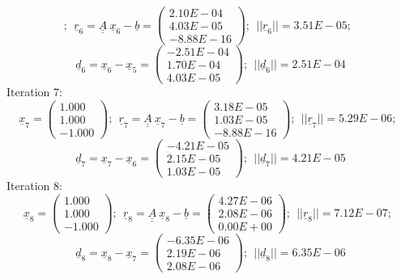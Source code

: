 \documentclass{report}[10pts]
\begin{document}
\begin{small}
\[;~~
\underline{r}_{6}=
\underline{\underline{A}}~\underline{x}_{6}-
\underline{b}=
   \begin{pmatrix}
   2.10E-04 \\ 4.03E-05 \\ -8.88E-16
   \end{pmatrix}
;~~
||
\underline{r}_{6}
||=
3.51E-05
;~~
\]
\[
\underline{d}_{6}=
\underline{x}_{6}-
\underline{x}_{5}=
   \begin{pmatrix}
   -2.51E-04 \\ 1.70E-04 \\ 4.03E-05
   \end{pmatrix}
;~~
||
\underline{d}_{6}
||=
2.51E-04
\]
Iteration 7:
\[
\underline{x}_{7}=
   \begin{pmatrix}
   1.000 \\ 1.000 \\ -1.000
   \end{pmatrix}
;~~
\underline{r}_{7}=
\underline{\underline{A}}~\underline{x}_{7}-
\underline{b}=
   \begin{pmatrix}
   3.18E-05 \\ 1.03E-05 \\ -8.88E-16
   \end{pmatrix}
;~~
||
\underline{r}_{7}
||=
5.29E-06
;~~
\]
\[
\underline{d}_{7}=
\underline{x}_{7}-
\underline{x}_{6}=
   \begin{pmatrix}
   -4.21E-05 \\ 2.15E-05 \\ 1.03E-05
   \end{pmatrix}
;~~
||
\underline{d}_{7}
||=
4.21E-05
\]
Iteration 8:
\[
\underline{x}_{8}=
   \begin{pmatrix}
   1.000 \\ 1.000 \\ -1.000
   \end{pmatrix}
;~~
\underline{r}_{8}=
\underline{\underline{A}}~\underline{x}_{8}-
\underline{b}=
   \begin{pmatrix}
   4.27E-06 \\ 2.08E-06 \\ 0.00E+00
   \end{pmatrix}
;~~
||
\underline{r}_{8}
||=
7.12E-07
;~~
\]
\[
\underline{d}_{8}=
\underline{x}_{8}-
\underline{x}_{7}=
   \begin{pmatrix}
   -6.35E-06 \\ 2.19E-06 \\ 2.08E-06
   \end{pmatrix}
;~~
||
\underline{d}_{8}
||=
6.35E-06
\]

\end{small}
\end{document}
